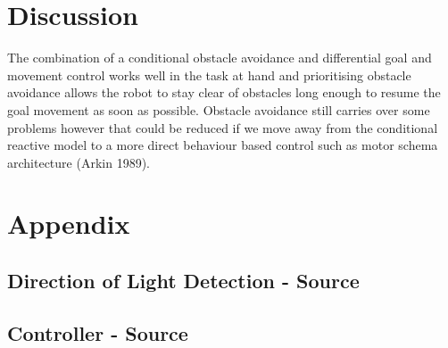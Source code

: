 \documentclass[paper=a4, fontsize=12pt]{scrartcl}	%
\numberwithin{equation}{section}		%
\numberwithin{figure}{section}			%
\numberwithin{table}{section}				%
\begin{document}
\section{Discussion}
The combination of a conditional obstacle avoidance and differential goal and movement control works well in the task at hand and prioritising obstacle avoidance allows the robot to stay clear of obstacles long enough to resume the goal movement as soon as possible. Obstacle avoidance still carries over some problems however that could be reduced if we move away from the conditional reactive model to a more direct behaviour based control such as motor schema architecture (Arkin 1989).
\section{Appendix}
\subsection{Direction of Light Detection - Source}

\subsection{Controller - Source}


\end{document}

